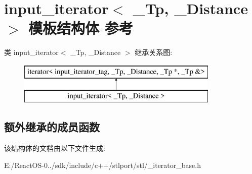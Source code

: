 \hypertarget{structinput__iterator}{}\section{input\+\_\+iterator$<$ \+\_\+\+Tp, \+\_\+\+Distance $>$ 模板结构体 参考}
\label{structinput__iterator}
类 input\+\_\+iterator$<$ \+\_\+\+Tp, \+\_\+\+Distance $>$ 继承关系图\+:\begin{figure}[H]
\begin{center}
\leavevmode
\includegraphics[height=2.000000cm]{structinput__iterator}
\end{center}
\end{figure}
\subsection*{额外继承的成员函数}


该结构体的文档由以下文件生成\+:\begin{DoxyCompactItemize}
\item 
E\+:/\+React\+O\+S-\/0../sdk/include/c++/stlport/stl/\+\_\+iterator\+\_\+base.\+h\end{DoxyCompactItemize}
